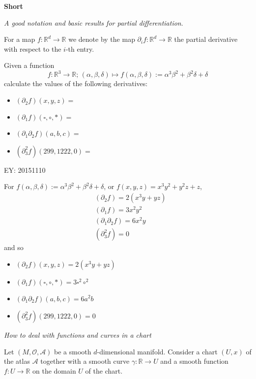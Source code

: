 	\textbf{Short} 
	
	\emph{A good notation and basic results for partial differentiation}.
	
	For a map $f: \mathbb{R}^d \to \mathbb{R}$ we denote by the map $\partial_i f: \mathbb{R}^d \to \mathbb{R}$ the partial derivative with respect to the $i$-th entry.
	
	\questionhead{:} Given a function
	\[
	f: \mathbb{R}^3 \to \mathbb{R}; \, (\alpha, \beta, \delta) \mapsto f(\alpha,\beta,\delta) := \alpha^3\beta^2 + \beta^2 \delta + \delta
	\]
	calculate the values of the following derivatives:
	
	\solutionhead{:}
	
	\begin{itemize}
	\item $(\partial_2f)(x,y,z) = $
	\item $(\partial_1f)(\square,\circ,*) =$
	\item $(\partial_1 \partial_2 f)(a,b,c) = $ 
	\item $(\partial_3^2 f)(299,1222,0) =$
	\end{itemize}
	
	EY: 20151110
	
	For $f(\alpha,\beta,\delta) := \alpha^3\beta^2 + \beta^2 \delta + \delta$, or $f(x,y,z) = x^3 y^2 + y^2 z + z$, 
	\[
	\begin{aligned}
	& (\partial_2 f) = 2(x^3y+yz) \\ 
	& (\partial_1 f) = 3x^2 y^2 \\ 
	& (\partial_1\partial_2 f) = 6x^2 y \\ 
	& (\partial_3^2f) = 0 
	\end{aligned}
	\]
	and so 
	\begin{itemize}
	\item $(\partial_2f)(x,y,z) = 2(x^3 y + yz)  $
	\item $(\partial_1f)(\square,\circ,*) = 3\square^2 \circ^2$
	\item $(\partial_1 \partial_2 f)(a,b,c) = 6a^2 b$ 
	\item $(\partial_3^2 f)(299,1222,0) = 0$
	\end{itemize}
	
	
	
	
	\emph{How to deal with functions and curves in a chart} 
	
	Let $(M, \mathcal{O}, \mathcal{A})$ be a smooth $d$-dimensional manifold.  Consider a chart $(U,x)$ of the atlas $\mathcal{A}$ together with a smooth curve $\gamma : \mathbb{R} \to U$ and a smooth function $f:U \to \mathbb{R}$ on the domain $U$ of the chart. 
	
